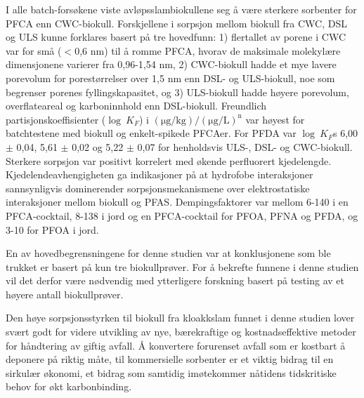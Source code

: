 I alle batch-forsøkene viste avløpsslambiokullene seg å være sterkere sorbenter for PFCA enn CWC-biokull. Forskjellene i sorpsjon mellom biokull fra CWC, DSL og ULS kunne forklares basert på tre hovedfunn: 1) flertallet av porene i CWC var for små ($<$0,6 nm) til å romme PFCA, hvorav de maksimale molekylære dimensjonene varierer fra 0,96-1,54 nm, 2) CWC-biokull hadde et mye lavere porevolum for porestørrelser over 1,5 nm enn DSL- og ULS-biokull, noe som begrenser porenes fyllingskapasitet, og 3) ULS-biokull hadde høyere porevolum, overflateareal og karboninnhold enn DSL-biokull. Freundlich partisjonskoeffisienter ($\log~K_F$) i $\mathrm{(\mu g/kg)/(\mu g/L)^n}$ var høyest for batchtestene med biokull og enkelt-spikede PFCAer. For PFDA var $\log~K_F$s 6,00 $\pm$ 0,04, 5,61 $\pm$ 0,02 og 5,22 $\pm$ 0,07 for henholdsvis ULS-, DSL- og CWC-biokull. Sterkere sorpsjon var positivt korrelert med økende perfluorert kjedelengde. Kjedelendeavhengigheten ga indikasjoner på at hydrofobe interaksjoner sannsynligvis dominerender sorpsjonsmekanismene over elektrostatiske interaksjoner mellom biokull og PFAS. Dempingsfaktorer var mellom 6-140 i en PFCA-cocktail, 8-138 i jord og en PFCA-cocktail for PFOA, PFNA og PFDA, og 3-10 for PFOA i jord.

En av hovedbegrensningene for denne studien var at konklusjonene som ble trukket er basert på kun tre biokullprøver. For å bekrefte funnene i denne studien vil det derfor være nødvendig med ytterligere forskning basert på testing av et høyere antall biokullprøver. 

Den høye sorpsjonsstyrken til biokull fra kloakkslam funnet i denne studien lover svært godt for videre utvikling av nye, bærekraftige og kostnadseffektive metoder for håndtering av giftig avfall. Å konvertere forurenset avfall som er kostbart å deponere på riktig måte, til kommersielle sorbenter er et viktig bidrag til en sirkulær økonomi, et bidrag som samtidig imøtekommer nåtidens tidskritiske behov for økt karbonbinding.



